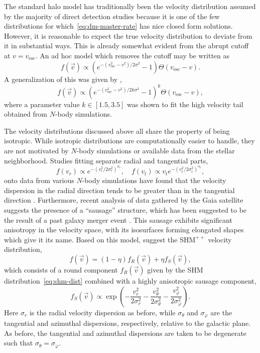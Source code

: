 The standard halo model has traditionally been the velocity distribution assumed by the majority of direct detection studies because it is one of the few distributions for which~\eqref{eq:dm-master-rate} has nice closed form solutions. However, it is reasonable to expect the true velocity distribution to deviate from it in substantial ways. This is already somewhat evident from the abrupt cutoff at $v=v_\text{esc}$. An ad hoc model which removes the cutoff may be written as
\begin{equation}
    f(\vec{v})\propto(e^{-(v_\text{esc}^2-v^2)/2\sigma^2}-1)\Theta(v_\text{esc}-v).
\end{equation}
A generalization of this was given by \textcite{LisantiEtAl2011},
\begin{equation}
    f(\vec{v})\propto(e^{-(v_\text{esc}^2-v^2)/2k\sigma^2}-1)^k\Theta(v_\text{esc}-v),
\end{equation}
where a parameter value $k\in[1.5,3.5]$ was shown to fit the high velocity tail obtained from $N$-body simulations.

The velocity distributions discussed above all share the property of being isotropic. While isotropic distributions are computationally easier to handle, they are not motivated by $N$-body simulations or available data from the stellar neighborhood. Studies fitting separate radial and tangential parts,
\begin{equation}
    f(v_r)\propto e^{-(v_r^2/2\sigma_r^2)^{\alpha_r}},\quad f(v_t)\propto v_te^{-(v_t^2/2\sigma_t^2)^{\alpha_t}},
\end{equation}
onto data from various $N$-body simulations have found that the velocity dispersion in the radial direction tends to be greater than in the tangential direction \parencites{FairbairnSchwetz2009, KuhlenEtAl2010}. Furthermore, recent analysis of data gathered by the Gaia satellite suggests the presence of a ``sausage'' structure, which has been suggested to be the result of a past galaxy merger event \parencites{BelokurovEtAl2018, KruijssenEtAl2018, HelmiEtAl2018}. This sausage exhibits significant anisotropy  in the velocity space, with its isosurfaces forming elongated shapes which give it its name. Based on this model, \textcite{EvansOHareMcCabe2019} suggest the $\text{SHM}^{++}$ velocity distribution,
\begin{equation}
    f(\vec{v})=(1-\eta)f_R(\vec{v})+\eta f_S(\vec{v}),
\end{equation}
which consists of a round component $f_R(\vec{v})$ given by the SHM distribution~\eqref{eq:shm-dist} combined with a highly anisotropic sausage component,
\begin{equation}
    f_S(\vec{v})\propto\exp\left(-\frac{v_r^2}{2\sigma_r^2}-\frac{v_\theta^2}{2\sigma_\theta^2}-\frac{v_\varphi^2}{2\sigma_\varphi^2}\right).
\end{equation}
Here $\sigma_r$ is the radial velocity dispersion as before, while $\sigma_\theta$ and $\sigma_\varphi$ are the tangential and azimuthal dispersions, respectively, relative to the galactic plane. As before, the tangential and azimuthal dispersions are taken to be degenerate such that $\sigma_\theta=\sigma_\varphi$.

